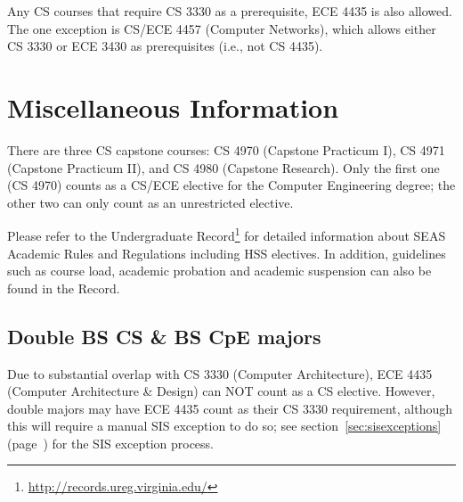 \documentclass[10pt,letter,twocolumn]{book}
\newenvironment{itemlist}{
\begin{itemize}
\setlength{\itemsep}{0pt}
\setlength{\parskip}{0pt}}
{\end{itemize}}
\newcommand{\mysection}[1]{\section{#1}\renewcommand{\rightmark}{#1}}
\newcommand{\myurl}[1]{\footnote{\scriptsize\url{#1}}}
\begin{document}
Any CS courses that require CS 3330 as a prerequisite, ECE 4435 is
also allowed.  The one exception is CS/ECE 4457 (Computer Networks),
which allows either CS 3330 or ECE 3430 as prerequisites (i.e., not
CS 4435).


\mysection{Miscellaneous Information}

There are three CS capstone courses: CS 4970 (Capstone Practicum I), 
CS 4971 (Capstone Practicum II), and CS 4980 (Capstone Research).
Only the first one (CS 4970) counts as a CS/ECE elective for the
Computer Engineering degree; the other two can only count as an
unrestricted elective.

Please refer to the Undergraduate
Record\myurl{http://records.ureg.virginia.edu/} for detailed
information about SEAS Academic Rules and Regulations including HSS
electives. In addition, guidelines such as course load, academic
probation and academic suspension can also be found in the Record.


\subsection{Double BS CS \& BS CpE majors}
\label{bscscpedoublemajors}

Due to substantial overlap with CS 3330 (Computer Architecture), ECE
4435 (Computer Architecture \& Design) can NOT count as a CS elective.
However, double majors may have ECE 4435 count as their CS 3330
requirement, although this will require a manual SIS exception to do
so; see section~\ref{sec:sisexceptions}
(page~\pageref{sec:sisexceptions}) for the SIS exception process.
\end{document}
